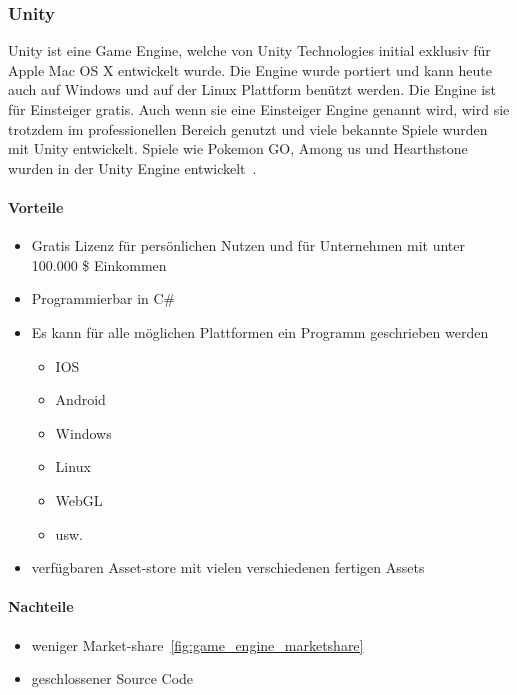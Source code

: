 \subsubsection{Unity}

Unity ist eine Game Engine, welche von Unity Technologies initial exklusiv für Apple Mac OS X entwickelt wurde.
Die Engine wurde portiert und kann heute auch auf Windows und auf der Linux Plattform benützt werden.
Die Engine ist für Einsteiger gratis.
Auch wenn sie eine Einsteiger Engine genannt wird, wird sie trotzdem im professionellen Bereich genutzt und viele bekannte Spiele wurden mit Unity entwickelt.
Spiele wie Pokemon GO, Among us und Hearthstone wurden in der Unity Engine entwickelt~\cite{Haas2014AHO,UNITY_DOWNLOADS,UNITY_PRICING,WIKIPEDIA_2014}.

\paragraph{Vorteile}

\begin{itemize}
    \item Gratis Lizenz für persönlichen Nutzen und für Unternehmen mit unter 100.000 \$ Einkommen
    \item Programmierbar in C\#
    \item Es kann für alle möglichen Plattformen ein Programm geschrieben werden
    \begin{itemize}
        \item IOS
        \item Android
        \item Windows
        \item Linux
        \item WebGL
        \item usw.
    \end{itemize}
    \item verfügbaren Asset-store mit vielen verschiedenen fertigen Assets
\end{itemize}

\paragraph{Nachteile}

\begin{itemize}
    \item weniger Market-share~\ref{fig:game_engine_marketshare}
    \item geschlossener Source Code
\end{itemize}

